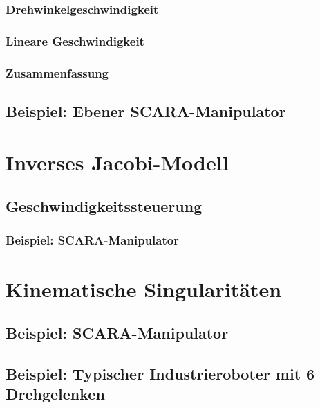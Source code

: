 \documentclass[a4paper, 11pt, accentcolor = tud3b]{tudreport}
\begin{document}
				\subsubsection{Drehwinkelgeschwindigkeit} %

				\subsubsection{Lineare Geschwindigkeit} %

				\subsubsection{Zusammenfassung} %

			\subsection{Beispiel: Ebener SCARA-Manipulator} %

		\section{Inverses Jacobi-Modell} %

			\subsection{Geschwindigkeitssteuerung} %

				\subsubsection{Beispiel: SCARA-Manipulator} %

		\section{Kinematische Singularitäten} %

			\subsection{Beispiel: SCARA-Manipulator} %

			\subsection{Beispiel: Typischer Industrieroboter mit 6 Drehgelenken} %
\end{document}
